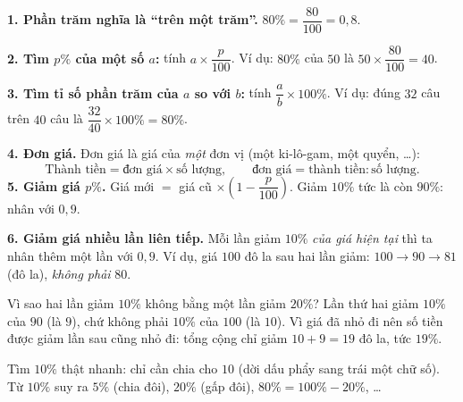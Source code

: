 \begin{knowbox}
\textbf{1. Phần trăm nghĩa là ``trên một trăm''.} $80\% = \dfrac{80}{100} = 0{,}8$.

\textbf{2. Tìm $p\%$ của một số $a$:} tính $a \times \dfrac{p}{100}$. Ví dụ: $80\%$ của $50$ là
$50 \times \dfrac{80}{100} = 40$.

\textbf{3. Tìm tỉ số phần trăm của $a$ so với $b$:} tính $\dfrac{a}{b}\times 100\%$. Ví dụ: đúng $32$ câu trên $40$ câu
là $\dfrac{32}{40}\times 100\% = 80\%$.

\textbf{4. Đơn giá.} Đơn giá là giá của \emph{một} đơn vị (một ki-lô-gam, một quyển, \ldots):
\[ \text{Thành tiền} = \text{đơn giá} \times \text{số lượng}, \qquad \text{đơn giá} = \text{thành tiền} : \text{số lượng}. \]
\textbf{5. Giảm giá $p\%$.} Giá mới $= $ giá cũ $\times \left(1 - \dfrac{p}{100}\right)$. Giảm $10\%$ tức là còn
$90\%$: nhân với $0{,}9$.

\textbf{6. Giảm giá nhiều lần liên tiếp.} Mỗi lần giảm $10\%$ \emph{của giá hiện tại} thì ta nhân thêm một lần với
$0{,}9$. Ví dụ, giá $100$ đô la sau hai lần giảm: $100 \to 90 \to 81$ (đô la), \emph{không phải} $80$.
\end{knowbox}
\begin{proofbox}
Vì sao hai lần giảm $10\%$ không bằng một lần giảm $20\%$? Lần thứ hai giảm $10\%$ của $90$ (là $9$), chứ không phải
$10\%$ của $100$ (là $10$). Vì giá đã nhỏ đi nên số tiền được giảm lần sau cũng nhỏ đi: tổng cộng chỉ giảm
$10 + 9 = 19$ đô la, tức $19\%$.
\end{proofbox}
\begin{tipbox}
Tìm $10\%$ thật nhanh: chỉ cần chia cho $10$ (dời dấu phẩy sang trái một chữ số). Từ $10\%$ suy ra
$5\%$ (chia đôi), $20\%$ (gấp đôi), $80\% = 100\% - 20\%$, \ldots
\end{tipbox}


